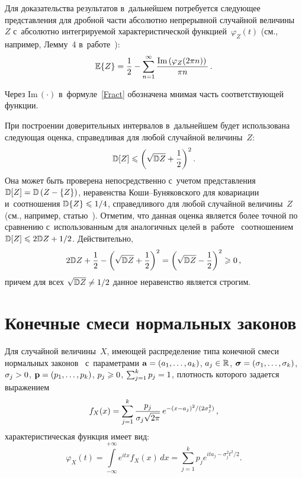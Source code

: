 \begin{multicols}{2}
Для доказательства результатов в~дальнейшем потребуется следующее 
представления для дробной части  абсолютно непрерывной случайной величины~$Z$ 
с~абсолютно  интегрируемой характеристической функцией~$\varphi_Z(t)$
 (см., например, Лемму~4 в~работе~\cite{Ushakov2017b}):
\begin{equation}
\label{Fract}
\mathbb{E}\{Z\}=\displaystyle\frac{\displaystyle 1\mathstrut}{\displaystyle 2\mathstrut}-\sum\limits_{n=1}^\infty 
\displaystyle\frac{\displaystyle \mathrm{Im}\left (\varphi_Z(2\pi n)\right)\mathstrut}{\displaystyle \pi n\mathstrut}\,.
\end{equation}

Через $\mathrm{Im}\,(\cdot)$ в~формуле~\eqref{Fract} обозначена мнимая часть 
соответствующей функции.

При построении доверительных интервалов в~дальнейшем будет 
использована следующая оценка, справедливая для любой случайной величины~$Z$:
\begin{equation}
\mathbb{D}[Z]\leqslant \left(\sqrt{\mathbb{D} Z}+\displaystyle\frac{\displaystyle 1\mathstrut}{\displaystyle 2\mathstrut}\right)^2.
\label{Var}
\end{equation}
Она может быть проверена непосредственно с~учетом представления 
$\mathbb{D} [Z]\hm=\mathbb{D}\left(Z\hm-\{Z\}\right)$, неравенства 
Ко\-ши--Бу\-ня\-ков\-ско\-го для ковариации и~соотношения 
 $\mathbb{D}\{Z\}\hm\leqslant 1/4$, справедливого для любой случайной величины~$Z$ 
 (см., например, статью~\cite{Ushakov2017b}). Отметим, что данная оценка 
 является более точной по сравнению с~использованным для аналогичных 
 целей в~работе~\cite{Ushakov2017b} соотношением 
 $\mathbb{D} [Z]\hm\leqslant 2\mathbb{D} Z\hm+1/2$. Действительно,
\begin{equation*}
2\mathbb{D} Z+\displaystyle\frac{\displaystyle 1\mathstrut}{\displaystyle 2\mathstrut}-\left(\sqrt{\mathbb{D} Z}+\displaystyle\frac{\displaystyle 1\mathstrut}{\displaystyle 2\mathstrut}\right)^2=
\left(\sqrt{\mathbb{D} Z}-\displaystyle\frac{\displaystyle 1\mathstrut}{\displaystyle 2\mathstrut}\right)^2\geqslant0\,,
\end{equation*}
причем для всех $\sqrt{\mathbb{D} Z}\hm\neq {1}/{2}$ 
данное неравенство является строгим.

\section{Конечные смеси нормальных законов}

Для случайной величины~$X$, имеющей распределение типа 
конечной смеси нормальных законов~\cite{Korolev2011-i} с~параметрами 
${\bf a}\hm=(a_1,\ldots, a_k)$, $a_j\hm\in \mathbb{R}$, 
$\boldsymbol{\sigma}\hm=(\sigma_1,\ldots, \sigma_k)$, 
$\sigma_j\hm>0$, ${\bf p}\hm=(p_1,\ldots, p_k)$, $p_j\hm\geqslant 0$, 
$\sum\nolimits_{j=1}^{k}p_j\hm=1$, плот\-ность которого задается выражением
\begin{equation}
f_X(x)=\sum\limits_{j=1}^{k}\displaystyle\frac{\displaystyle p_j\mathstrut}{\displaystyle \sigma_j\sqrt{2\pi}\mathstrut}\,e^{-(x-a_j)^2/(2\sigma_j^2)}\,,
\label{FinNormMixt}
\end{equation}
характеристическая функция имеет вид:
\begin{equation}
\varphi_X(t)=\int\limits_{-\infty}^{+\infty}\!\!e^{itx} f_X(x)\, dx = 
\sum\limits_{j=1}^{k}p_j e^{ita_j-\sigma_j^2 t^2/2}.
\label{ChiFinNormMixt}
\end{equation}


\end{multicols}
